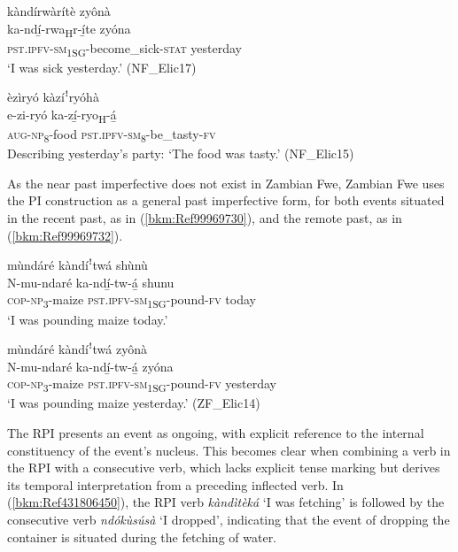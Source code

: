 \ea
\label{bkm:Ref99969709}
kàndírwàrítè zyônà\\
\gll ka-ndí̲-rwa\textsubscript{H}r-í̲te        zyóna\\
\textsc{pst}.\textsc{ipfv}-\textsc{sm}\textsubscript{1SG}-become\_sick-\textsc{stat}  yesterday\\
\glt ‘I was sick yesterday.’ (NF\_Elic17)
\z

\ea
\label{bkm:Ref99969710}
èzìryó kàzíꜝryóhà\\
\gll e-zi-ryó    ka-zí̲-ryo\textsubscript{H}-á̲\\
\textsc{aug}-\textsc{np}\textsubscript{8}-food  \textsc{pst}.\textsc{ipfv}-\textsc{sm}\textsubscript{8}-be\_tasty-\textsc{fv}\\
\glt Describing yesterday’s party: ‘The food was tasty.’ (NF\_Elic15)
\z

As the near past imperfective does not exist in Zambian Fwe, Zambian Fwe uses the PI construction as a general past imperfective form, for both events situated in the recent past, as in (\ref{bkm:Ref99969730}), and the remote past, as in (\ref{bkm:Ref99969732}).

\ea
\label{bkm:Ref99969730}
mùndáré kàndíꜝtwá shùnù\\
\gll N-mu-ndaré    ka-ndí̲-tw-á̲      shunu\\
\textsc{cop}-\textsc{np}\textsubscript{3}-maize  \textsc{pst}.\textsc{ipfv}-\textsc{sm}\textsubscript{1SG}-pound-\textsc{fv}  today\\
\glt ‘I was pounding maize today.’
\z

\ea
\label{bkm:Ref99969732}
mùndáré kàndíꜝtwá zyônà\\
\gll N-mu-ndaré    ka-ndí̲-tw-á̲      zyóna\\
\textsc{cop}-\textsc{np}\textsubscript{3}-maize  \textsc{pst}.\textsc{ipfv}-\textsc{sm}\textsubscript{1SG}-pound-\textsc{fv}  yesterday\\
\glt ‘I was pounding maize yesterday.’ (ZF\_Elic14)
\z

The RPI presents an event as ongoing, with explicit reference to the internal constituency of the event’s nucleus. This becomes clear when combining a verb in the RPI with a consecutive verb, which lacks explicit tense marking but derives its temporal interpretation from a preceding inflected verb. In (\ref{bkm:Ref431806450}), the RPI verb \textit{kàndìtèká} ‘I was fetching’ is followed by the consecutive verb \textit{ndókùsúsà} ‘I dropped’, indicating that the event of dropping the container is situated during the fetching of water.

